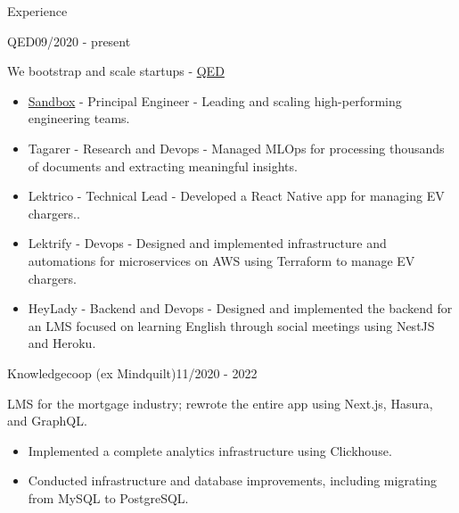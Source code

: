 \documentclass{resume}
\begin{document}
\begin{rSection}{Experience}
    \begin{rSubsection}{QED}{09/2020 - present}{}{}
        \item We bootstrap and scale startups - \href{https://qed.builders.com}{QED}
        \begin{itemize}
            \setlength\itemsep{-0.3em}
	    \item \href{https://www.sandbox.game/en/}{Sandbox} - Principal Engineer - Leading and scaling high-performing engineering teams.
            \item Tagarer - Research and Devops - Managed MLOps for processing thousands of documents and extracting meaningful insights.
            \item Lektrico - Technical Lead - Developed a React Native app for managing EV chargers..
            \item Lektrify - Devops - Designed and implemented infrastructure and automations for microservices on AWS using Terraform to manage EV chargers.
            \item HeyLady - Backend and Devops - Designed and implemented the backend for an LMS focused on learning English through social meetings using NestJS and Heroku.
        \end{itemize}
    \end{rSubsection}

    \begin{rSubsection}{Knowledgecoop (ex Mindquilt)}{11/2020 - 2022}{}{}
        \item LMS for the mortgage industry; rewrote the entire app using Next.js, Hasura, and GraphQL.
        \begin{itemize}
            \setlength\itemsep{-0.3em}
            \item Implemented a complete analytics infrastructure using Clickhouse.
            \item Conducted infrastructure and database improvements, including migrating from MySQL to PostgreSQL.
        \end{itemize}
    \end{rSubsection}


\end{rSection}
\end{document}
